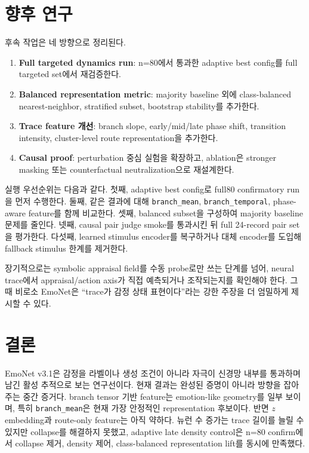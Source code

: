 \documentclass[11pt,a4paper]{article}
\begin{document}
\section{향후 연구}

후속 작업은 네 방향으로 정리된다.

\begin{enumerate}
  \item \textbf{Full targeted dynamics run}: n=80에서 통과한 adaptive best config를 full targeted set에서 재검증한다.
  \item \textbf{Balanced representation metric}: majority baseline 외에 class-balanced nearest-neighbor, stratified subset, bootstrap stability를 추가한다.
  \item \textbf{Trace feature 개선}: branch slope, early/mid/late phase shift, transition intensity, cluster-level route representation을 추가한다.
  \item \textbf{Causal proof}: perturbation 중심 실험을 확장하고, ablation은 stronger masking 또는 counterfactual neutralization으로 재설계한다.
\end{enumerate}

실행 우선순위는 다음과 같다. 첫째, adaptive best config로 full80 confirmatory run을 먼저 수행한다. 둘째, 같은 결과에 대해 \texttt{branch\_mean}, \texttt{branch\_temporal}, phase-aware feature를 함께 비교한다. 셋째, balanced subset을 구성하여 majority baseline 문제를 줄인다. 넷째, causal pair judge smoke를 통과시킨 뒤 full 24-record pair set을 평가한다. 다섯째, learned stimulus encoder를 복구하거나 대체 encoder를 도입해 fallback stimulus 한계를 제거한다.

장기적으로는 symbolic appraisal field를 수동 probe로만 쓰는 단계를 넘어, neural trace에서 appraisal/action axis가 직접 예측되거나 조작되는지를 확인해야 한다. 그때 비로소 EmoNet은 ``trace가 감정 상태 표현이다''라는 강한 주장을 더 엄밀하게 제시할 수 있다.

\section{결론}

EmoNet v3.1은 감정을 라벨이나 생성 조건이 아니라 자극이 신경망 내부를 통과하며 남긴 활성 추적으로 보는 연구선이다. 현재 결과는 완성된 증명이 아니라 방향을 잡아주는 중간 증거다. branch tensor 기반 feature는 emotion-like geometry를 일부 보이며, 특히 \texttt{branch\_mean}은 현재 가장 안정적인 representation 후보이다. 반면 \(z\) embedding과 route-only feature는 아직 약하다. 뉴런 수 증가는 trace 길이를 늘릴 수 있지만 collapse를 해결하지 못했고, adaptive late density control은 n=80 confirm에서 collapse 제거, density 제어, class-balanced representation lift를 동시에 만족했다.
\end{document}
